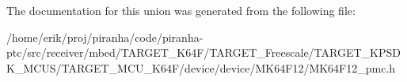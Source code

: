 The documentation for this union was generated from the following file\+:\begin{DoxyCompactItemize}
\item 
/home/erik/proj/piranha/code/piranha-\/ptc/src/receiver/mbed/\+T\+A\+R\+G\+E\+T\+\_\+\+K64\+F/\+T\+A\+R\+G\+E\+T\+\_\+\+Freescale/\+T\+A\+R\+G\+E\+T\+\_\+\+K\+P\+S\+D\+K\+\_\+\+M\+C\+U\+S/\+T\+A\+R\+G\+E\+T\+\_\+\+M\+C\+U\+\_\+\+K64\+F/device/device/\+M\+K64\+F12/M\+K64\+F12\+\_\+pmc.\+h\end{DoxyCompactItemize}
